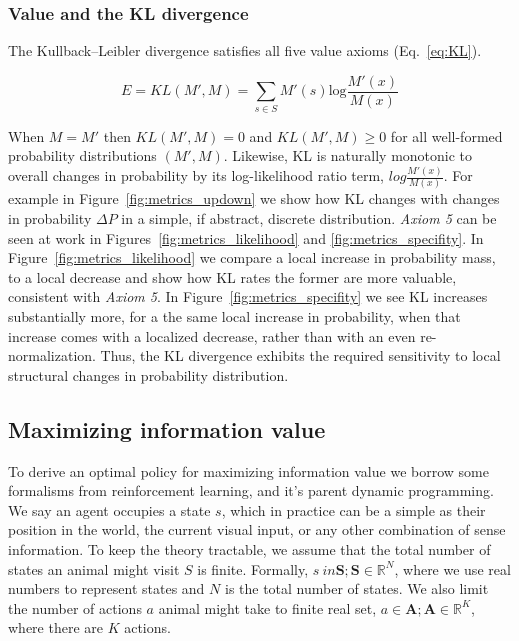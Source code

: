 \documentclass[9pt,twocolumn,twoside]{pnas-new}
\begin{document}
\subsubsection*{Value and the KL divergence}
 The Kullback--Leibler divergence satisfies all five value axioms (Eq.~\ref{eq:KL}). 

\begin{equation}
    E = KL(M', M) = \sum_{s \in S} M'(s) \text{log} \frac{M'(x)}{M(x)} 
    \label{eq:KL}
\end{equation}

When $M = M'$ then $KL(M', M) = 0$ and $KL(M', M) \geq 0$ for all well-formed probability distributions $(M', M)$. Likewise, KL is naturally monotonic to overall changes in probability by its log-likelihood ratio term, $log \frac{M'(x)}{M(x)}$. For example in Figure~\ref{fig:metrics_updown} we show how KL changes with changes in probability $\Delta P$ in a simple, if abstract, discrete distribution. \textit{Axiom 5} can be seen at work in Figures~\ref{fig:metrics_likelihood} and \ref{fig:metrics_specifity}. In Figure~\ref{fig:metrics_likelihood} we compare a local increase in probability mass, to a local decrease and show how KL rates the former are more valuable, consistent with \textit{Axiom 5}. In Figure~\ref{fig:metrics_specifity} we see KL increases substantially more, for a the same local increase in probability, when that increase comes with a localized decrease, rather than with an even re-normalization. Thus, the KL divergence exhibits the required sensitivity to local structural changes in probability distribution.


\subsection*{Maximizing information value}
To derive an optimal policy for maximizing information value we borrow some formalisms from reinforcement learning, and it's parent dynamic programming. We say an agent occupies a state $s$, which in practice can be a simple as their position in the world, the current visual input, or any other combination of sense information. To keep the theory tractable, we assume that the total number of states an animal might visit $S$ is finite. Formally, $s\ in \textbf{S}; \textbf{S} \in \mathbb{R}^N$, where we use real numbers to represent states and $N$ is the total number of states. We also limit the number of actions $a$ animal might take to finite real set, $a \in \textbf{A}; \textbf{A} \in \mathbb{R}^K$, where there are $K$ actions. 
\end{document}
